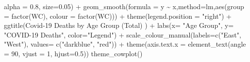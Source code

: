 \documentclass[
]{article}
\newenvironment{Shaded}{\begin{snugshade}}{\end{snugshade}}
\newcommand{\AttributeTok}[1]{\textcolor[rgb]{0.77,0.63,0.00}{#1}}
\newcommand{\DecValTok}[1]{\textcolor[rgb]{0.00,0.00,0.81}{#1}}
\newcommand{\FloatTok}[1]{\textcolor[rgb]{0.00,0.00,0.81}{#1}}
\newcommand{\FunctionTok}[1]{\textcolor[rgb]{0.00,0.00,0.00}{#1}}
\newcommand{\NormalTok}[1]{#1}
\newcommand{\SpecialCharTok}[1]{\textcolor[rgb]{0.00,0.00,0.00}{#1}}
\newcommand{\StringTok}[1]{\textcolor[rgb]{0.31,0.60,0.02}{#1}}
\begin{document}
\begin{Shaded}
\begin{Highlighting}[]
             \AttributeTok{alpha =} \FloatTok{0.8}\NormalTok{,}
             \AttributeTok{size=}\FloatTok{0.05}\NormalTok{) }\SpecialCharTok{+}
  \FunctionTok{geom\_smooth}\NormalTok{(}\AttributeTok{formula =}\NormalTok{ y }\SpecialCharTok{\textasciitilde{}}\NormalTok{ x,}\AttributeTok{method=}\StringTok{\textquotesingle{}lm\textquotesingle{}}\NormalTok{,}\FunctionTok{aes}\NormalTok{(}\AttributeTok{group =} \FunctionTok{factor}\NormalTok{(WC), }
                              \AttributeTok{colour =} \FunctionTok{factor}\NormalTok{(WC))) }\SpecialCharTok{+} 
  \FunctionTok{theme}\NormalTok{(}\AttributeTok{legend.position =} \StringTok{"right"}\NormalTok{) }\SpecialCharTok{+} 
  \FunctionTok{ggtitle}\NormalTok{(}\StringTok{\textquotesingle{}Covid{-}19 Deaths by Age Group (Total) \textquotesingle{}}\NormalTok{) }\SpecialCharTok{+}
  \FunctionTok{labs}\NormalTok{(}\AttributeTok{x=} \StringTok{"Age Group"}\NormalTok{, }\AttributeTok{y=} \StringTok{"COVID{-}19 Deaths"}\NormalTok{, }\AttributeTok{color=}\StringTok{"Legend"}\NormalTok{) }\SpecialCharTok{+}
  \FunctionTok{scale\_colour\_manual}\NormalTok{(}\AttributeTok{labels=}\FunctionTok{c}\NormalTok{(}\StringTok{"East"}\NormalTok{, }\StringTok{"West"}\NormalTok{), }\AttributeTok{values=} \FunctionTok{c}\NormalTok{(}\StringTok{"darkblue"}\NormalTok{, }\StringTok{"red"}\NormalTok{)) }\SpecialCharTok{+}
  \FunctionTok{theme}\NormalTok{(}\AttributeTok{axis.text.x =} \FunctionTok{element\_text}\NormalTok{(}\AttributeTok{angle =} \DecValTok{90}\NormalTok{, }\AttributeTok{vjust =} \DecValTok{1}\NormalTok{, }\AttributeTok{hjust=}\FloatTok{0.5}\NormalTok{))}
  \FunctionTok{theme\_cowplot}\NormalTok{()}
\end{Highlighting}
\end{Shaded}
\end{document}
